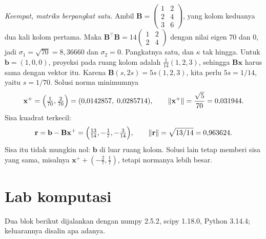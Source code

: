 \emph{Keempat, matriks berpangkat satu.} Ambil
$\mathbf{B}=\begin{pmatrix}1&2\\ 2&4\\ 3&6\end{pmatrix}$, yang kolom keduanya dua kali
kolom pertama. Maka $\mathbf{B}^{\top}\mathbf{B}=14\begin{pmatrix}1&2\\ 2&4\end{pmatrix}$
dengan nilai eigen $70$ dan $0$, jadi $\sigma_{1}=\sqrt{70}=8{,}36660$ dan
$\sigma_{2}=0$. Pangkatnya satu, dan $\kappa$ tak hingga. Untuk $\mathbf{b}=(1,0,0)$,
proyeksi pada ruang kolom adalah $\frac{1}{14}(1,2,3)$, sehingga $\mathbf{B}\mathbf{x}$
harus sama dengan vektor itu. Karena $\mathbf{B}(s,2s)=5s(1,2,3)$, kita perlu
$5s=1/14$, yaitu $s=1/70$. Solusi norma minimumnya
\[
  \mathbf{x}^{+}=\Bigl(\tfrac{1}{70},\tfrac{2}{70}\Bigr)=(0{,}0142857,\;0{,}0285714),
  \qquad
  \|\mathbf{x}^{+}\|=\frac{\sqrt{5}}{70}=0{,}031944 .
\]
Sisa kuadrat terkecil:
\[
  \mathbf{r}=\mathbf{b}-\mathbf{B}\mathbf{x}^{+}
  =\Bigl(\tfrac{13}{14},-\tfrac17,-\tfrac{3}{14}\Bigr),
  \qquad
  \|\mathbf{r}\|=\sqrt{13/14}=0{,}963624 .
\]
Sisa itu tidak mungkin nol: $\mathbf{b}$ di luar ruang kolom. Solusi lain tetap memberi
sisa yang sama, misalnya $\mathbf{x}^{+}+(-\tfrac27,\tfrac17)$, tetapi normanya lebih
besar.


\section{Lab komputasi}

Dua blok berikut dijalankan dengan numpy 2.5.2, scipy 1.18.0, Python 3.14.4; keluarannya
disalin apa adanya.


